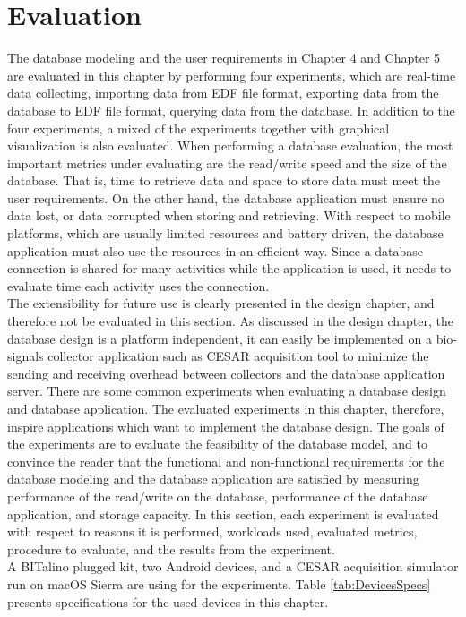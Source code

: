 \chapter{Evaluation}
The database modeling and the user requirements in Chapter 4 and Chapter 5 are evaluated in this chapter by performing four experiments, which are real-time data collecting, importing data from EDF file format, exporting data from the database to EDF file format, querying data from the database. In addition to the four experiments, a mixed of the experiments together with graphical visualization is also evaluated. When performing a database evaluation, the most important metrics under evaluating are the read/write speed and the size of the database. That is, time to retrieve data and space to store data must meet the user requirements. On the other hand, the database application must ensure no data lost, or data corrupted when storing and retrieving. With respect to mobile platforms, which are usually limited resources and battery driven, the database application must also use the resources in an efficient way. Since a database connection is shared for many activities while the application is used, it needs to evaluate time each activity uses the connection.\\
The extensibility for future use is clearly presented in the design chapter, and therefore not be evaluated in this section. As discussed in the design chapter, the database design is a platform independent, it can easily be implemented on a bio-signals collector application such as CESAR acquisition tool to minimize the sending and receiving overhead between collectors and the database application server. There are some common experiments when evaluating a database design and database application. The evaluated experiments in this chapter, therefore, inspire applications which want to implement the database design.
The goals of the experiments are to evaluate the feasibility of the database model, and to convince the reader that the functional and non-functional requirements for the database modeling and the database application are satisfied by measuring performance of the read/write on the database, performance of the database application, and storage capacity. In this section, each experiment is evaluated with respect to reasons it is performed, workloads used, evaluated metrics, procedure to evaluate, and the results from the experiment.\\
A BITalino plugged kit, two Android devices, and a CESAR acquisition simulator run on macOS Sierra are using for the experiments. Table \ref{tab:DevicesSpecs} presents specifications for the used devices in this chapter.
